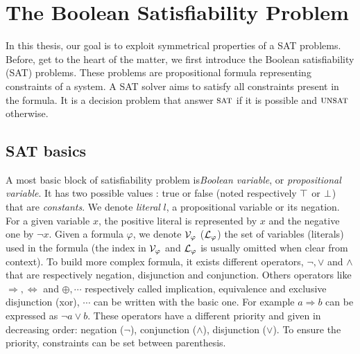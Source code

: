 \chapter{The Boolean Satisfiability Problem}\label{chap:preliminaries}
\minitoc
In this thesis, our goal is to exploit symmetrical properties of a SAT problems.
Before, get to the heart of the matter, we first introduce the Boolean satisfiability (SAT)  problems.
These problems are propositional formula  representing constraints of a system.
A SAT solver aims to satisfy all constraints present in the formula.
It is a decision problem that answer $\textsc{sat}$ if it is possible and $\textsc{unsat}$ otherwise.
\section{SAT basics}
A most basic block of satisfiability problem is\emph{Boolean variable}, or \emph{propositional variable}.
It has two possible values : true or false (noted respectively $\top$ or $\bot$) that are \emph{constants}.
We denote \emph{literal} $l$, a propositional variable or its negation.
For a given variable $x$, the positive literal is represented by $x$ and the negative one by $\neg x$.
Given a formula $\varphi$, we denote $\mathcal{V}_\varphi$ ($\mathcal{L}_\varphi$) the set of variables (literals) used in the formula (the index in $\mathcal{V}_\varphi$ and $\mathcal{L}_\varphi$ is usually omitted when
clear from context).
To build more complex formula, it exists different operators, $\neg, \lor$ and $\land$ that are respectively negation, disjunction and conjunction. Others operators like $\Rightarrow, \Leftrightarrow$ and
$\oplus, \cdots$ respectively called implication, equivalence and exclusive disjunction (xor), $\cdots$ can be written with the basic one.
For example $a \Rightarrow b$ can be expressed as $ \neg a \lor b$.
These operators have a different priority and given in decreasing order:
negation ($\neg$), conjunction ($\land$), disjunction ($\lor$). To ensure
the priority, constraints can be set between parenthesis.

